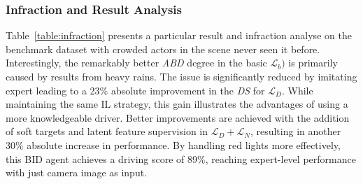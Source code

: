 \subsubsection{Infraction and Result Analysis}


\hspace{1pc}Table~\ref{table:infraction} presents a particular result and infraction analyse on the benchmark dataset with crowded actors in the scene never seen it before. 
Interestingly, the remarkably better \emph{ABD} degree in the basic $\mathcal{L}_b)$ is primarily caused by results from heavy rains. 
The issue is significantly reduced by imitating expert leading to a 23\% absolute improvement in the \emph{DS} for $\mathcal{L}_D$.
While maintaining the same IL strategy, this gain illustrates the advantages of using a more knowledgeable driver. 
Better improvements are achieved with the addition of soft targets and latent feature supervision in $\mathcal{L}_D+\mathcal{L}_N$, resulting in another 30\% absolute increase in performance. 
By handling red lights more effectively, this BID agent achieves a driving score of 89\%, reaching expert-level performance with just camera image as input.





 